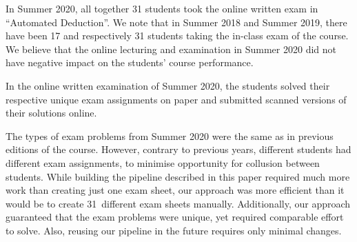 In Summer 2020, all together 31 students took the online written exam
in ``Automated Deduction''. We note that in Summer 2018 and Summer
2019, there have been 17 and respectively 31 students taking
the in-class exam of the course. We believe that the
online lecturing and examination in Summer 2020 did not have negative
impact on the students' course performance.

In the online written examination of Summer 2020, the  students solved
their respective unique exam assignments on paper and submitted
scanned versions of their
solutions online. 

The types of exam problems from Summer 2020  were the same as in
previous editions of the course. 
However, contrary to previous years, different students had different exam
assignments, to minimise opportunity for collusion between students.
%
While building the pipeline described in this paper required much more work
than creating just one exam sheet, our approach was more efficient than
it would be to create 31~different exam sheets manually. Additionally,
our approach guaranteed that the exam problems were
unique, yet required comparable effort to solve.
Also, reusing our pipeline in the future requires only minimal changes.

